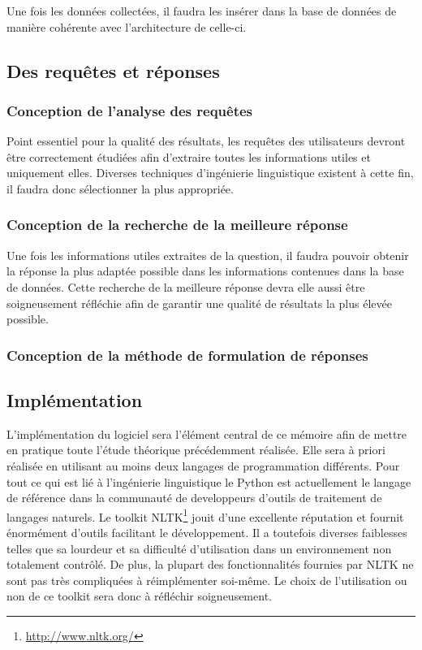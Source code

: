 \documentclass[12pt]{article}
\begin{document}
Une fois les données collectées, il faudra les insérer dans la base de données de manière cohérente avec l'architecture de celle-ci.
\subsection{Des requêtes et réponses}
\subsubsection{Conception de l'analyse des requêtes}
Point essentiel pour la qualité des résultats, les requêtes des utilisateurs devront être correctement étudiées afin d'extraire toutes les informations utiles et uniquement elles.
Diverses techniques d'ingénierie linguistique existent à cette fin, il faudra donc sélectionner la plus appropriée. 
\subsubsection{Conception de la recherche de la meilleure réponse}
Une fois les informations utiles extraites de la question, il faudra pouvoir obtenir la réponse la plus adaptée possible dans les informations contenues dans la base de données.
Cette recherche de la meilleure réponse devra elle aussi être soigneusement réfléchie afin de garantir une qualité de résultats la plus élevée possible.
\subsubsection{Conception de la méthode de formulation de réponses}
\subsection{Implémentation}
L'implémentation du logiciel sera l'élément central de ce mémoire afin de mettre en pratique toute l'étude théorique précédemment réalisée.
Elle sera à priori réalisée en utilisant au moins deux langages de programmation différents.
Pour tout ce qui est lié à l'ingénierie linguistique le Python est actuellement le langage de référence dans la communauté de developpeurs d'outils de traitement de langages naturels.
Le toolkit NLTK\footnote{\url{http://www.nltk.org/}} jouit d'une excellente réputation et fournit énormément d'outils facilitant le développement.
Il a toutefois diverses faiblesses telles que sa lourdeur et sa difficulté d'utilisation dans un environnement non totalement contrôlé.
De plus, la plupart des fonctionnalités fournies par NLTK ne sont pas très compliquées à réimplémenter soi-même.
Le choix de l'utilisation ou non de ce toolkit sera donc à réfléchir soigneusement. \\
\end{document}
